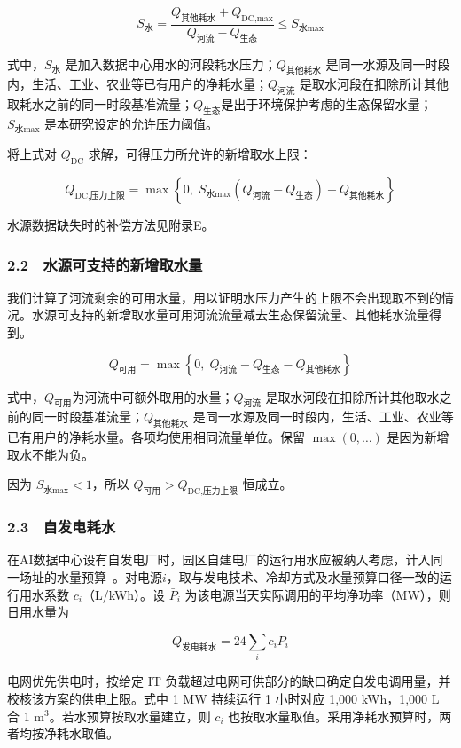 \[
S_{\text{水}}=\frac{Q_{\text{其他耗水}}+Q_{\text{DC,max}}}{Q_{\text{河流}}-Q_{\text{生态}}}\leq S_{\text{水}\max}
\]

式中，$S_{\text{水}}$ 是加入数据中心用水的河段耗水压力；$Q_{\text{其他耗水}}$ 是同一水源及同一时段内，生活、工业、农业等已有用户的净耗水量；$Q_{\text{河流}}$ 是取水河段在扣除所计其他取耗水之前的同一时段基准流量；$Q_{\text{生态}}$是出于环境保护考虑的生态保留水量；$S_{\text{水}\max}$ 是本研究设定的允许压力阈值。

将上式对 $Q_{\text{DC}}$ 求解，可得压力所允许的新增取水上限：

\[
Q_{\text{DC,压力上限}}
= \max\left\{0,\; S_{\text{水}\max}\left(Q_{\text{河流}}-Q_{\text{生态}}\right)-Q_{\text{其他耗水}}\right\}
\]

水源数据缺失时的补偿方法见附录E。

\subsubsection{2.2　水源可支持的新增取水量}

我们计算了河流剩余的可用水量，用以证明水压力产生的上限不会出现取不到的情况。水源可支持的新增取水量可用河流流量减去生态保留流量、其他耗水流量得到。

\[
Q_{\text{可用}}
= \max\left\{0,\;
Q_{\text{河流}}-Q_{\text{生态}}-Q_{\text{其他耗水}}
\right\}
\]

式中，$Q_{\text{可用}}$为河流中可额外取用的水量；$Q_{\text{河流}}$ 是取水河段在扣除所计其他取水之前的同一时段基准流量；$Q_{\text{其他耗水}}$ 是同一水源及同一时段内，生活、工业、农业等已有用户的净耗水量。各项均使用相同流量单位。保留 $\max(0, \ldots)$ 是因为新增取水不能为负。\cite{q1bref02,q1bref03,q1bref08}

因为 $S_{\text{水}\max}<1$，所以 $Q_{\text{可用}}>Q_{\text{DC,压力上限}}$ 恒成立。

\subsubsection{2.3　自发电耗水}

在AI数据中心设有自发电厂时，园区自建电厂的运行用水应被纳入考虑，计入同一场址的水量预算~\cite{q1bref10}。对电源$i$，取与发电技术、冷却方式及水量预算口径一致的运行用水系数 $c_i$（L/kWh）。设 $\bar P_i$ 为该电源当天实际调用的平均净功率（MW），则日用水量为

\[
Q_{\text{发电耗水}}=24\sum_i c_i\bar P_i
\]

电网优先供电时，按给定 IT 负载超过电网可供部分的缺口确定自发电调用量，并校核该方案的供电上限。式中 1 MW 持续运行 1 小时对应 1,000 kWh，1,000 L 合 1 m$^3$。若水预算按取水量建立，则 $c_i$ 也按取水量取值。采用净耗水预算时，两者均按净耗水取值。

